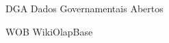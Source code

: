 
\begin{siglas}
    \item[DGA] Dados Governamentais Abertos
    \item[WOB] WikiOlapBase
\end{siglas}

